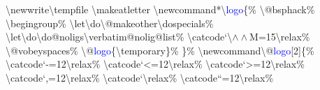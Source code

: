 \resetlinenumber
\begin{linenumbers}\singlespacing\ttfamily
\textbackslash newwrite\textbackslash tempf{}ile\newline
\textbackslash makeatletter\newline
\textbackslash newcommand*\textbackslash \textcolor{blue}{logo}\{\%\newline
\hspace*{1.2em}\textbackslash @bsphack\%\newline
\hspace*{1.2em}\textbackslash begingroup\%\newline
\hspace*{1.2em}\textbackslash let\textbackslash do\textbackslash @makeother\textbackslash dospecials\%\newline
\hspace*{1.2em}\textbackslash let\textbackslash do\textbackslash do@noligs\textbackslash verbatim@nolig@list\%\newline
\hspace*{1.2em}\textbackslash catcode`\textbackslash $\wedge\wedge$M=15\textbackslash relax\%\newline
\hspace*{1.2em}\textbackslash @vobeyspaces\%\newline
\hspace*{1.2em}\textbackslash @\textcolor{blue}{logo}\{\textbackslash temporary\}\%\newline
\}\%\newline
\textbackslash newcommand\textbackslash @\textcolor{blue}{logo}[2]\{\%\newline
\hspace*{1.2em}\textbackslash catcode`-=12\textbackslash relax\%\newline
\hspace*{1.2em}\textbackslash catcode`<=12\textbackslash relax\%\newline
\hspace*{1.2em}\textbackslash catcode`>=12\textbackslash relax\%\newline
\hspace*{1.2em}\textbackslash catcode`,=12\textbackslash relax\%\newline
\hspace*{1.2em}\textbackslash catcode`\textbackslash relax\%\newline
\hspace*{1.2em}\textbackslash catcode``=12\textbackslash relax\%\newline

\end{linenumbers}
